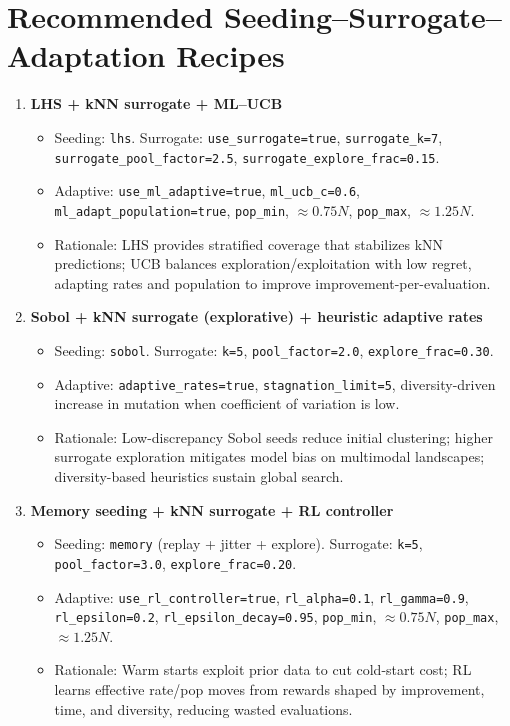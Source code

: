 \documentclass[12pt,a4paper]{article}
\begin{document}
\section{Recommended Seeding–Surrogate–Adaptation Recipes}
\label{sec}
\begin{enumerate}

\item \textbf{LHS + kNN surrogate + ML–UCB}
\begin{itemize}
\item Seeding: \texttt{lhs}. Surrogate: \texttt{use\_surrogate=true}, \texttt{surrogate\_k=7}, \texttt{surrogate\_pool\_factor=2.5}, \texttt{surrogate\_explore\_frac=0.15}.
\item Adaptive: \texttt{use\_ml\_adaptive=true}, \texttt{ml\_ucb\_c=0.6}, \texttt{ml\_adapt\_population=true}, \texttt{pop\_min}, $\approx 0.75N$, \texttt{pop\_max}, $\approx 1.25N$.
\item Rationale: LHS provides stratified coverage that stabilizes kNN predictions; UCB balances exploration/exploitation with low regret, adapting rates and population to improve improvement-per-evaluation.
\end{itemize}

\item \textbf{Sobol + kNN surrogate (explorative) + heuristic adaptive rates}
\begin{itemize}
\item Seeding: \texttt{sobol}. Surrogate: \texttt{k=5}, \texttt{pool\_factor=2.0}, \texttt{explore\_frac=0.30}.
\item Adaptive: \texttt{adaptive\_rates=true}, \texttt{stagnation\_limit=5}, diversity-driven increase in mutation when coefficient of variation is low.
\item Rationale: Low-discrepancy Sobol seeds reduce initial clustering; higher surrogate exploration mitigates model bias on multimodal landscapes; diversity-based heuristics sustain global search.
\end{itemize}

\item \textbf{Memory seeding + kNN surrogate + RL controller}
\begin{itemize}
\item Seeding: \texttt{memory} (replay + jitter + explore). Surrogate: \texttt{k=5}, \texttt{pool\_factor=3.0}, \texttt{explore\_frac=0.20}.
\item Adaptive: \texttt{use\_rl\_controller=true}, \texttt{rl\_alpha=0.1}, \texttt{rl\_gamma=0.9}, \texttt{rl\_epsilon=0.2}, \texttt{rl\_epsilon\_decay=0.95}, \texttt{pop\_min}, $\approx 0.75N$, \texttt{pop\_max}, $\approx 1.25N$.
\item Rationale: Warm starts exploit prior data to cut cold-start cost; RL learns effective rate/pop moves from rewards shaped by improvement, time, and diversity, reducing wasted evaluations.
\end{itemize}


\end{enumerate}
\end{document}
